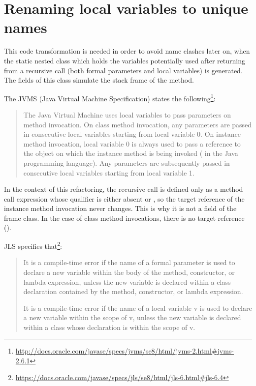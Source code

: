 \section{Renaming local variables to unique names}

This code transformation is needed in order to avoid name clashes later on, when the static nested class which
holds the variables potentially used after returning from a recursive call (both formal parameters and local variables)
is generated. The fields of this class simulate the stack frame of the method.

The JVMS\cite{jvms} (Java Virtual Machine Specification) states the
following\footnote{\url{http://docs.oracle.com/javase/specs/jvms/se8/html/jvms-2.html#jvms-2.6.1}}:

\begin{quote}
    The Java Virtual Machine uses local variables to pass parameters on method invocation. On class method invocation,
    any parameters are passed in consecutive local variables starting from local variable 0. On instance method invocation,
    local variable 0 is always used to pass a reference to the object on which the instance method is being invoked
    ( in the Java programming language). Any parameters are subsequently passed in consecutive local
    variables starting from local variable 1.
\end{quote}

In the context of this refactoring, the recursive call is defined only as a method call expression whose qualifier is
either absent or , so the target reference of the instance method invocation never changes. This is why it is
not a field of the frame class. In the case of class method invocations, there is no target reference ().

JLS specifies that\footnote{\url{https://docs.oracle.com/javase/specs/jls/se8/html/jls-6.html#jls-6.4}}:
\begin{quote}
    It is a compile-time error if the name of a formal parameter is used to declare a new variable within the body of
    the method, constructor, or lambda expression, unless the new variable is declared within a class declaration
    contained by the method, constructor, or lambda expression.

    It is a compile-time error if the name of a local variable v is used to declare a new variable within the scope of
    v, unless the new variable is declared within a class whose declaration is within the scope of v.
\end{quote}

